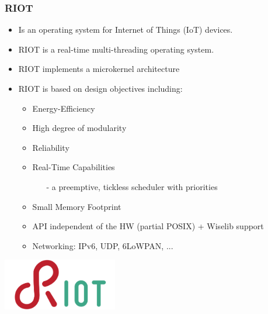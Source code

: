 \documentclass{beamer}
\begin{document}
\begin{frame}
	\frametitle{RIOT}
	\begin{itemize}
		\item Is an operating system for Internet of Things (IoT) devices.
		\item RIOT is a \textcolor{TextOrange}{real-time} \textcolor{TextOrange}{multi-threading} operating system.
		\item RIOT implements a \textcolor{TextGreen}{microkernel} architecture
		\item RIOT is based on design objectives including:
		\begin{itemize}
			\item Energy-Efficiency
			\item High degree of modularity
			\item Reliability
			\item Real-Time Capabilities
			\begin{itemize}
				\item[-] a preemptive, tickless scheduler with priorities
			\end{itemize}
			\item Small Memory Footprint
			\item API independent of the HW (partial POSIX) + Wiselib support
			\item Networking: IPv6, UDP, 6LoWPAN, ...
		\end{itemize}
	\end{itemize}
	\vspace{.05cm}
	\hspace*{7cm} \includegraphics[width=5cm]{figs/riot-logo.png}
\end{frame}
\end{document}
